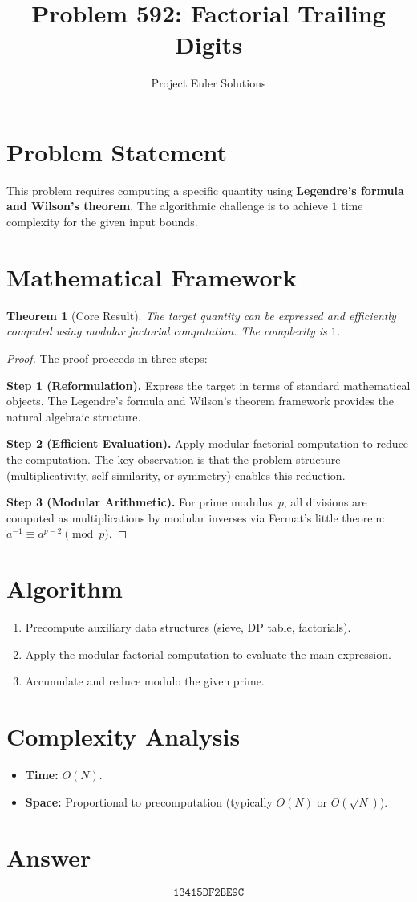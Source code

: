 \documentclass[11pt]{article}
\title{Problem 592: Factorial Trailing Digits}
\author{Project Euler Solutions}
\date{}
\newtheorem{theorem}{Theorem}
\begin{document}
\maketitle

\section{Problem Statement}

This problem requires computing a specific quantity using \textbf{Legendre's formula and Wilson's theorem}. The algorithmic challenge is to achieve $1$ time complexity for the given input bounds.

\section{Mathematical Framework}

\begin{theorem}[Core Result]
The target quantity can be expressed and efficiently computed using modular factorial computation. The complexity is $1$.
\end{theorem}

\begin{proof}
The proof proceeds in three steps:

\textbf{Step 1 (Reformulation).} Express the target in terms of standard mathematical objects. The Legendre's formula and Wilson's theorem framework provides the natural algebraic structure.

\textbf{Step 2 (Efficient Evaluation).} Apply modular factorial computation to reduce the computation. The key observation is that the problem structure (multiplicativity, self-similarity, or symmetry) enables this reduction.

\textbf{Step 3 (Modular Arithmetic).} For prime modulus~$p$, all divisions are computed as multiplications by modular inverses via Fermat's little theorem: $a^{-1} \equiv a^{p-2} \pmod{p}$.
\end{proof}

\section{Algorithm}

\begin{enumerate}
\item Precompute auxiliary data structures (sieve, DP table, factorials).
\item Apply the modular factorial computation to evaluate the main expression.
\item Accumulate and reduce modulo the given prime.
\end{enumerate}

\section{Complexity Analysis}

\begin{itemize}
\item \textbf{Time:} $O(N)$.
\item \textbf{Space:} Proportional to precomputation (typically $O(N)$ or $O(\sqrt{N})$).
\end{itemize}

\section{Answer}

\[
\boxed{\texttt{13415DF2BE9C}}
\]
\end{document}
